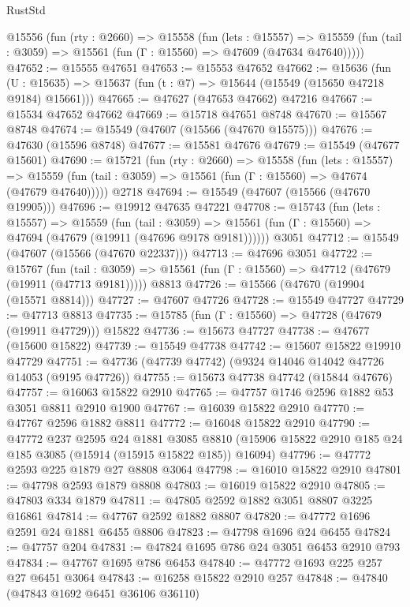\begin{lexlean}{RustStd}
\begin{coremodule}
  @15556
    (fun (rty : @2660) =>
    @15558
      (fun (lets : @15557) =>
      @15559 (fun (tail : @3059) => @15561 (fun (Γ : @15560) => @47609 (@47634 @47640)))))
@47652 := @15555 @47651
@47653 := @15553 @47652
@47662 := @15636
    (fun (U : @15635) => @15637 (fun (t : @7) => @15644 (@15549 (@15650 @47218 @9184) @15661)))
@47665 := @47627 (@47653 @47662) @47216
@47667 := @15534 @47652 @47662
@47669 := @15718 @47651 @8748
@47670 := @15567 @8748
@47674 := @15549 (@47607 (@15566 (@47670 @15575)))
@47676 := @47630 (@15596 @8748)
@47677 := @15581 @47676
@47679 := @15549 (@47677 @15601)
@47690 := @15721
    (fun (rty : @2660) =>
    @15558
      (fun (lets : @15557) =>
      @15559 (fun (tail : @3059) => @15561 (fun (Γ : @15560) => @47674 (@47679 @47640)))))
    @2718
@47694 := @15549 (@47607 (@15566 (@47670 @19905)))
@47696 := @19912 @47635 @47221
@47708 := @15743
    (fun (lets : @15557) =>
    @15559
      (fun (tail : @3059) =>
      @15561 (fun (Γ : @15560) => @47694 (@47679 (@19911 (@47696 @9178 @9181))))))
    @3051
@47712 := @15549 (@47607 (@15566 (@47670 @22337)))
@47713 := @47696 @3051
@47722 := @15767
    (fun (tail : @3059) => @15561 (fun (Γ : @15560) => @47712 (@47679 (@19911 (@47713 @9181)))))
    @8813
@47726 := @15566 (@47670 (@19904 (@15571 @8814)))
@47727 := @47607 @47726
@47728 := @15549 @47727
@47729 := @47713 @8813
@47735 := @15785 (fun (Γ : @15560) => @47728 (@47679 (@19911 @47729))) @15822
@47736 := @15673 @47727
@47738 := @47677 (@15600 @15822)
@47739 := @15549 @47738
@47742 := @15607 @15822 @19910 @47729
@47751 := @47736 (@47739 @47742) (@9324 @14046 @14042 @47726 @14053 (@9195 @47726))
@47755 := @15673 @47738 @47742 (@15844 @47676)
@47757 := @16063 @15822 @2910
@47765 := @47757 @1746 @2596 @1882 @53 @3051 @8811 @2910 @1900
@47767 := @16039 @15822 @2910
@47770 := @47767 @2596 @1882 @8811
@47772 := @16048 @15822 @2910
@47790 := @47772
    @237
    @2595
    @24
    @1881
    @3085
    @8810
    (@15906 @15822 @2910 @185 @24 @185 @3085 (@15914 (@15915 @15822 @185)) @16094)
@47796 := @47772 @2593 @225 @1879 @27 @8808 @3064
@47798 := @16010 @15822 @2910
@47801 := @47798 @2593 @1879 @8808
@47803 := @16019 @15822 @2910
@47805 := @47803 @334 @1879
@47811 := @47805 @2592 @1882 @3051 @8807 @3225 @16861
@47814 := @47767 @2592 @1882 @8807
@47820 := @47772 @1696 @2591 @24 @1881 @6455 @8806
@47823 := @47798 @1696 @24 @6455
@47824 := @47757 @204
@47831 := @47824 @1695 @786 @24 @3051 @6453 @2910 @793
@47834 := @47767 @1695 @786 @6453
@47840 := @47772 @1693 @225 @257 @27 @6451 @3064
@47843 := @16258 @15822 @2910 @257
@47848 := @47840 (@47843 @1692 @6451 @36106 @36110)

\end{coremodule}
\end{lexlean}
